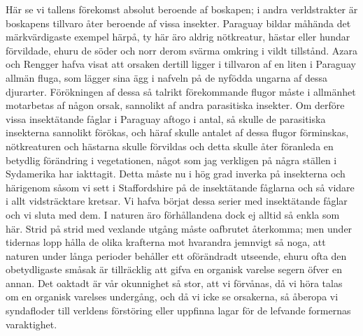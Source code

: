Här se vi tallens förekomst absolut beroende af boskapen; i andra verldstrakter är boskapens tillvaro åter beroende af vissa insekter. Paraguay bildar måhända det märkvärdigaste exempel härpå, ty här äro aldrig nötkreatur, hästar eller hundar förvildade, ehuru de söder och norr derom svärma omkring i vildt tillstånd. Azara och Rengger hafva visat att orsaken dertill ligger i tillvaron af en liten i Paraguay allmän fluga, som lägger sina ägg i nafveln på de nyfödda ungarna af dessa djurarter. Förökningen af dessa så talrikt förekommande flugor måste i allmänhet motarbetas af någon orsak, sannolikt af andra parasitiska insekter. Om derföre vissa insektätande fåglar i Paraguay aftogo i antal, så skulle de parasitiska insekterna sannolikt förökas, och häraf skulle antalet af dessa flugor förminskas, nötkreaturen och hästarna skulle förvildas och detta skulle åter föranleda en betydlig förändring i vegetationen, något som jag verkligen på några ställen i Sydamerika har iakttagit. Detta måste nu i hög grad inverka på insekterna och härigenom såsom vi sett i Staffordshire på de insektätande fåglarna och så vidare i allt vidsträcktare kretsar. Vi hafva börjat dessa serier med insektätande fåglar och vi sluta med dem. I naturen äro förhållandena dock ej alltid så enkla som här. Strid på strid med vexlande utgång måste oafbrutet återkomma; men under tidernas lopp hålla de olika krafterna mot hvarandra jemnvigt så noga, att naturen under långa perioder behåller ett oförändradt utseende, ehuru ofta den obetydligaste småsak är tillräcklig att gifva en organisk varelse segern öfver en annan. Det oaktadt är vår okunnighet så stor, att vi förvånas, då vi höra talas om en organisk varelses undergång, och då vi icke se orsakerna, så åberopa vi syndafloder till verldens förstöring eller uppfinna lagar för de lefvande formernas varaktighet.

